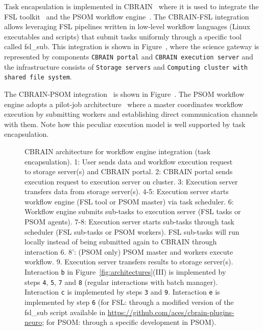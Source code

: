 \documentclass[preprint,3p,twocolumn]{elsarticle}
\begin{document}
Task encapsulation is implemented in CBRAIN~\cite{SHER-14} where it is
used to integrate the FSL toolkit~\cite{Jenkinson2012782} and the PSOM
workflow engine~\cite{bellec2012pipeline}. The CBRAIN-FSL integration
allows leveraging FSL pipelines written in low-level workflow
languages (Linux executables and scripts) that submit tasks uniformly
through a specific tool called fsl\_sub. This integration is shown in
Figure~, where the science gateway is
represented by components \texttt{CBRAIN portal} and \texttt{CBRAIN
  execution server} and the infrastructure consists of \texttt{Storage
  servers} and \texttt{Computing cluster with shared file system}.

The CBRAIN-PSOM integration~\cite{GLAT-16} is shown in
Figure~. The PSOM workflow engine
adopts a pilot-job architecture~\cite{turilli2015comprehensive} where
a master coordinates workflow execution by submitting workers and
establishing direct communication channels with them. Note how this
peculiar execution model is well supported by task encapsulation.

\begin{figure}
\centering
{} \hfill {}
\caption{CBRAIN architecture for workflow engine integration
  (task encapsulation).  1: User sends data and workflow execution request to
  storage server(s) and CBRAIN portal. 2: CBRAIN portal sends
  execution request to execution server on cluster. 3: Execution
  server transfers data from storage server(s). 4-5: Execution server
  starts workflow engine (FSL tool or PSOM master) via task
  scheduler. 6: Workflow engine submits sub-tasks to execution server
  (FSL tasks or PSOM agents). 7-8: Execution server starts sub-tasks
  through task scheduler (FSL sub-tasks or PSOM workers). FSL sub-tasks will run locally
  instead of being submitted again to CBRAIN through interaction 6. 8':
  (PSOM only) PSOM master and workers execute workflow. 9. Execution
  server transfers results to storage server(s). Interaction
  \texttt{b} in Figure~\ref{fig:architectures}(III) is implemented by steps
  \texttt{4}, \texttt{5}, \texttt{7} and \texttt{8} (regular
  interactions with batch manager). Interaction \texttt{c} is
  implemented by steps \texttt{3} and \texttt{9}. Interaction
  \texttt{e} is implemented by step \texttt{6} (for FSL: through a
  modified version of the fsl\_sub script available in
  \url{https://github.com/aces/cbrain-plugins-neuro}; for PSOM:
  through a specific development in PSOM).}
\label{fig:cbrain-sub-tasking}
\end{figure}
\end{document}
